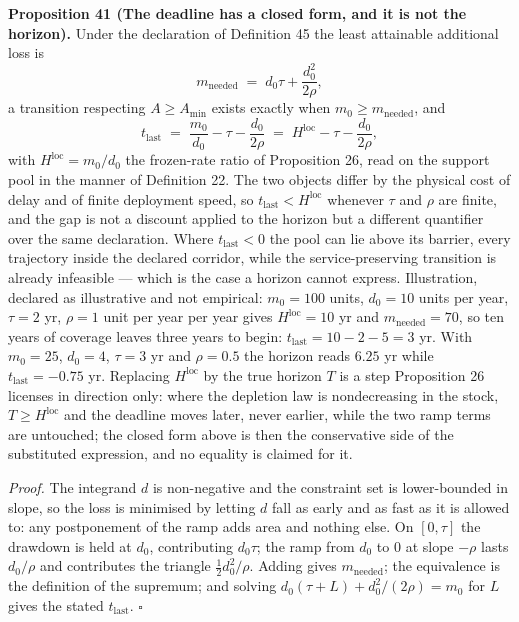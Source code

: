 \documentclass[11pt]{article}
\begin{document}
\textbf{Proposition 41 (The deadline has a closed form, and it is not the horizon).} Under the declaration of
Definition 45 the least attainable additional loss is
\[ m_{\mathrm{needed}} \;=\; d_0\tau + \frac{d_0^{2}}{2\rho} , \]
a transition respecting \(A \ge A_{\min}\) exists exactly when \(m_0 \ge m_{\mathrm{needed}}\), and
\[ t_{\mathrm{last}} \;=\; \frac{m_0}{d_0} - \tau - \frac{d_0}{2\rho} \;=\; H^{\mathrm{loc}} - \tau - \frac{d_0}{2\rho} , \]
with \(H^{\mathrm{loc}} = m_0/\allowbreak{}d_0\) the frozen-rate ratio of Proposition 26, read on the support pool in
the manner of Definition 22. The two objects differ by the
physical cost of delay and of finite deployment speed, so \(t_{\mathrm{last}} < H^{\mathrm{loc}}\) whenever
\(\tau\) and \(\rho\) are finite, and the gap is not a discount applied to the horizon but a different
quantifier over the same declaration. Where \(t_{\mathrm{last}} < 0\) the pool can lie above its barrier,
every trajectory inside the declared corridor, while the service-preserving transition is already
infeasible --- which is the case a horizon cannot express.
Illustration, declared as illustrative and not empirical: \(m_0 = 100\) units, \(d_0 = 10\) units per year,
\(\tau = 2\) yr, \(\rho = 1\) unit per year per year gives \(H^{\mathrm{loc}} = 10\) yr and \(m_{\mathrm{needed}} = 70\),
so ten years of coverage leaves three years to begin: \(t_{\mathrm{last}} = 10 - 2 - 5 = 3\) yr. With
\(m_0 = 25\), \(d_0 = 4\), \(\tau = 3\) yr and \(\rho = 0.5\) the horizon reads \(6.25\) yr while
\(t_{\mathrm{last}} = -0.75\) yr. Replacing \(H^{\mathrm{loc}}\) by the true horizon \(T\) is a step Proposition 26
licenses in direction only: where the depletion law is nondecreasing in the stock, \(T \ge H^{\mathrm{loc}}\)
and the deadline moves later, never earlier, while the two ramp terms are untouched; the closed form above is
then the conservative side of the substituted expression, and no equality is claimed for it.

\emph{Proof.} The integrand \(d\) is non-negative and the constraint set is lower-bounded in slope, so the loss is
minimised by letting \(d\) fall as early and as fast as it is allowed to: any postponement of the ramp adds
area and nothing else. On \([0, \tau]\) the drawdown is held at \(d_0\), contributing \(d_0 \tau\); the ramp from
\(d_0\) to \(0\) at slope \(-\rho\) lasts \(d_0/\rho\) and contributes the triangle \(\tfrac{1}{2} d_0^{2}/\rho\).
Adding gives \(m_{\mathrm{needed}}\); the equivalence is the definition of the supremum; and solving
\(d_0(\tau + L) + d_0^2/(2\rho) = m_0\) for \(L\) gives the stated \(t_{\mathrm{last}}\). \ensuremath{\square}
\end{document}
